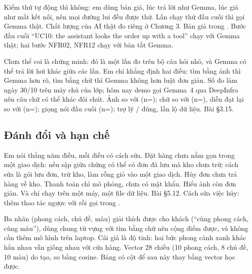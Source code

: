 {Kiểm thử tự động thì không: em dùng bản giả, lúc trả lời như Gemma, lúc giả như mất kết nối, nên mọi đường lui đều được thử. Lần chạy thử đầu cuối thì gọi Gemma thật. Chất lượng của AI thật đo riêng ở Chương 3.}
{Bản giả trong . Bước đầu cuối ``UC10: the assistant looks the order up with a tool'' chạy với Gemma thật; hai bước NFR02, NFR12 chạy với bản tắt Gemma.}

{Chưa thể coi là chứng minh: đó là một lần đo trên bộ câu hỏi nhỏ, và Gemma có thể trả lời hơi khác giữa các lần. Em chỉ khẳng định hai điều: tìm bằng ảnh thì Gemma hơn rõ, tìm bằng chữ thì Gemma không hơn luật đơn giản. Số đo làm ngày 30/10 trên máy chủ của lớp; hôm nay demo gọi Gemma~4 qua DeepInfra nên câu chữ có thể khác đôi chút.}
{Ảnh \evImageGemma{} so với \evImageLocal{} (n=\evImageN); chữ \evTextDirectGemma{} so với \evTextDirectRules{} (n=\evTextDirectN), diễn đạt lại \evTextParaGemma{} so với \evTextParaRules{} (n=\evTextParaN); giọng nói đầu cuối \evVoiceHit{} (n=\evVoiceN); trợ lý \evAssistantCorrect{}/\evAssistantN{} đúng, \evAssistantLeaks{} lần lộ dữ liệu. Bài §3.15.}

\subsection{Đánh đổi và hạn chế}\label{sec:hanche}
{Em nói thẳng năm điều, mỗi điều có cách sửa. Đặt hàng chưa nằm gọn trong một giao dịch: nếu sập giữa chừng có thể có đơn đã lưu mà kho chưa trừ; cách sửa là gói lưu đơn, trừ kho, làm rỗng giỏ vào một giao dịch. Hủy đơn chưa trả hàng về kho. Thanh toán chỉ mô phỏng, chưa có mật khẩu. Hiểu ảnh còn đơn giản. Và chỉ chạy trên một máy, một file dữ liệu.}
{Bài §5.12. Cách sửa việc hủy: thêm thao tác ngược với  rồi gọi trong .}

{Ba nhãn (phong cách, chủ đề, màu) giải thích được cho khách (``cùng phong cách, cùng màu''), dùng chung từ vựng với tìm bằng chữ nên cộng điểm được, và không cần thêm mô hình trên laptop. Cái giá là độ tinh: hai bức phong cảnh xanh khác hẳn nhau vẫn giống nhau với cửa hàng.}
{Vector 28 chiều (10 phong cách, 8 chủ đề, 10 màu) do  tạo, so bằng cosine. Bảng  có cột  để sau này thay bằng vector học được.}

